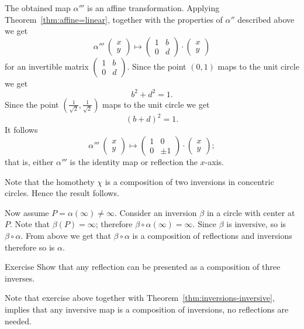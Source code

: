 The obtained map $\alpha'''$ is an affine transformation.
Applying Theorem~\ref{thm:affine=linear}, together with the properties of $\alpha''$ described above we get
\[\alpha'''\:\left(\begin{smallmatrix}
x\\ y
\end{smallmatrix} \right)
  \mapsto
  \left(\begin{smallmatrix}
1&b\\ 0&d
\end{smallmatrix} \right)
  \cdot
  \left(\begin{smallmatrix}
x\\ y
\end{smallmatrix} \right)
\]
for an invertible matrix $\left(\begin{smallmatrix}
1&b\\ 0&d
\end{smallmatrix} \right)$.
Since the point $(0,1)$ maps to the unit circle we get 
\[b^2+d^2=1.\]
Since the point $(\tfrac1{\sqrt{2}},\tfrac1{\sqrt{2}})$ maps to the unit circle we get 
\[(b+d)^2=1.\]
It follows 
\[\alpha'''\:\left(\begin{smallmatrix}
x\\ y
\end{smallmatrix} \right)
  \mapsto
  \left(\begin{smallmatrix}
1&0\\ 0&\pm1
\end{smallmatrix} \right)
\cdot
\left(\begin{smallmatrix}
x
\\ 
y
\end{smallmatrix} \right);
\]
that is, either $\alpha'''$ is the identity map 
or reflection the $x$-axis.

Note that the homothety $\chi$ is a composition of two inversions in concentric circles.
Hence the result follows.

Now assume $P=\alpha(\infty)\ne \infty$.
Consider an inversion $\beta$ in a circle with center at $P$.
Note that $\beta(P)=\infty$; therefore $\beta\circ\alpha(\infty)=\infty$.
Since $\beta$ is inversive, so is $\beta\circ\alpha$.
From above we get that $\beta\circ\alpha$ is a composition of reflections and inversions therefore so is $\alpha$.
\qeds

\begin{thm}{Exercise}\label{ex:reflection/inversive}
Show that any reflection can be presented as a composition of three inverses. 
\end{thm}

Note that exercise above together with Theorem~\ref{thm:inversions-inversive},
implies that any inversive map is a composition of inversions,
no reflections are needed.

